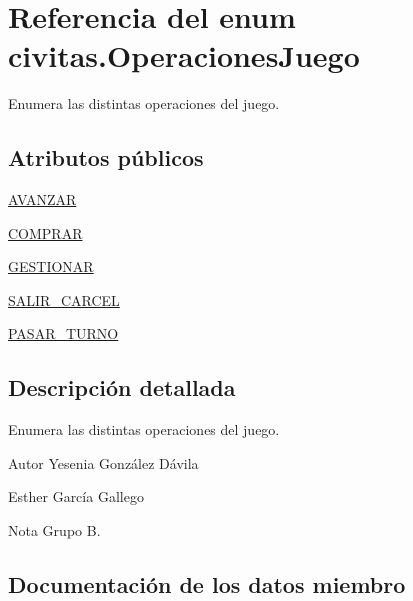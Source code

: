 \hypertarget{enumcivitas_1_1OperacionesJuego}{}\section{Referencia del enum civitas.\+Operaciones\+Juego}
\label{enumcivitas_1_1OperacionesJuego}


Enumera las distintas operaciones del juego.  


\subsection*{Atributos públicos}
\begin{DoxyCompactItemize}
\item 
\hyperlink{enumcivitas_1_1OperacionesJuego_a262997156b9ac5336d4c179d9b4b741e}{A\+V\+A\+N\+Z\+AR}
\item 
\hyperlink{enumcivitas_1_1OperacionesJuego_a1f329e7b57b28b492cbb4c69186cd93d}{C\+O\+M\+P\+R\+AR}
\item 
\hyperlink{enumcivitas_1_1OperacionesJuego_aca47dbc0fa7e2c1d53136ef50de7fdb3}{G\+E\+S\+T\+I\+O\+N\+AR}
\item 
\hyperlink{enumcivitas_1_1OperacionesJuego_ac24c415e2a8b58b5a103cb1cadf2e71e}{S\+A\+L\+I\+R\+\_\+\+C\+A\+R\+C\+EL}
\item 
\hyperlink{enumcivitas_1_1OperacionesJuego_a73c4377f4f9bb11eb0bd01c0212cf0ed}{P\+A\+S\+A\+R\+\_\+\+T\+U\+R\+NO}
\end{DoxyCompactItemize}


\subsection{Descripción detallada}
Enumera las distintas operaciones del juego. 

\begin{DoxyAuthor}{Autor}
Yesenia González Dávila 

Esther García Gallego 
\end{DoxyAuthor}
\begin{DoxyNote}{Nota}
Grupo B. 
\end{DoxyNote}


\subsection{Documentación de los datos miembro}
\mbox{\label{enumcivitas_1_1OperacionesJuego_a262997156b9ac5336d4c179d9b4b741e}} 
